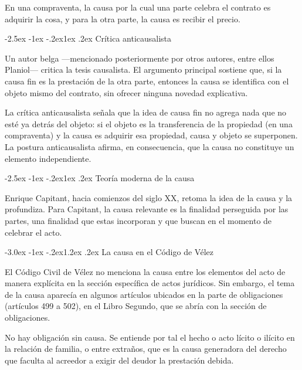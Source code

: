 \documentclass[12pt,oneside]{book}
\makeatletter
\renewcommand\section{\@startsection{section}{1}{\z@}%
  {-3.0ex \@plus -1ex \@minus -.2ex}{1.2ex \@plus .2ex}%
  {\normalfont\large\bfseries\color{acento}}}
\renewcommand\subsection{\@startsection{subsection}{2}{\z@}%
  {-2.5ex \@plus -1ex \@minus -.2ex}{1ex \@plus .2ex}%
  {\normalfont\normalsize\bfseries}}
\makeatother
\begin{document}
\begin{ejemplo}
En una compraventa, la causa por la cual una parte celebra el contrato es adquirir la cosa, y para la otra parte, la causa es recibir el precio.
\end{ejemplo}

\subsection{Crítica anticausalista}

Un autor belga ---mencionado posteriormente por otros autores, entre ellos Planiol--- critica la tesis causalista. El argumento principal sostiene que, si la causa fin es la prestación de la otra parte, entonces la causa se identifica con el objeto mismo del contrato, sin ofrecer ninguna novedad explicativa.

La crítica anticausalista señala que la idea de causa fin no agrega nada que no esté ya detrás del objeto: si el objeto es la transferencia de la propiedad (en una compraventa) y la causa es adquirir esa propiedad, causa y objeto se superponen. La postura anticausalista afirma, en consecuencia, que la causa no constituye un elemento independiente.

\subsection{Teoría moderna de la causa}

Enrique Capitant, hacia comienzos del siglo XX, retoma la idea de la causa y la profundiza. Para Capitant, la causa relevante es la finalidad perseguida por las partes, una finalidad que estas incorporan y que buscan en el momento de celebrar el acto.

\section{La causa en el Código de Vélez}

El Código Civil de Vélez no menciona la causa entre los elementos del acto de manera explícita en la sección específica de actos jurídicos. Sin embargo, el tema de la causa aparecía en algunos artículos ubicados en la parte de obligaciones (artículos 499 a 502), en el Libro Segundo, que se abría con la sección de obligaciones.

\begin{definicion}
No hay obligación sin causa. Se entiende por tal el hecho o acto lícito o ilícito en la relación de familia, o entre extraños, que es la causa generadora del derecho que faculta al acreedor a exigir del deudor la prestación debida.
\end{definicion}
\end{document}
